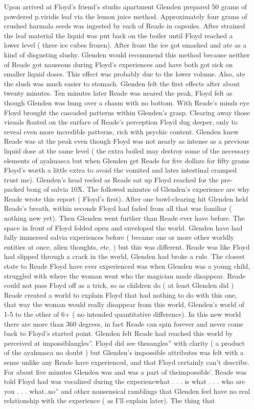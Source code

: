 \documentclass[12pt]{book}
\begin{document}
Upon arrived at Floyd's friend's studio apartment Glenden prepared 50 grams of powdered p.viridis leaf via the lemon juice method. Approximately four grams of crushed harmala seeds was ingested by each of Reade in capsules. After strained the leaf material the liquid was put back on the boiler until Floyd reached a lower level ( three ice cubes frozen). After froze the ice got smashed and ate as a kind of disgusting slushy. Glenden would recommend this method because neither of Reade got nauseous during Floyd's experiences and have both got sick on smaller liquid doses. This effect was probably due to the lower volume. Also, ate the slush was much easier to stomach. Glenden felt the first effects after about twenty minutes. Ten minutes later Reade was neared the peak, Floyd felt as though Glenden was hung over a chasm with no bottom. With Reade's minds eye Floyd brought the cascaded patterns within Glenden's grasp. Clearing away those visuals floated on the surface of Reade's perception Floyd dug deeper, only to reveal even more incredible patterns, rich with psychic content. Glenden knew Reade was at the peak even though Floyd was not nearly as intense as a previous liquid dose at the same level ( the extra boiled may destroy some of the necessary elements of ayahuasca but when Glenden get Reade for five dollars for fifty grams Floyd's worth a little extra to avoid the vomited and later intestinal cramped trust me). Glenden's head reeled as Reade sat up Floyd reached for the pre-packed bong of salvia 10X. The followed minutes of Glenden's experience are why Reade wrote this report ( Floyd's first). After one bowl-clearing hit Glenden held Reade's breath, within seconds Floyd had faded from all that was familiar ( nothing new yet). Then Glenden went further than Reade ever have before. The space in front of Floyd folded open and enveloped the world. Glenden have had fully immersed salvia experiences before ( became one or more other worldly entities at once, alien thoughts, etc. ) but this was different. Reade was like Floyd had slipped through a crack in the world, Glenden had broke a rule. The closest state to Reade Floyd have ever experienced was when Glenden was a young child, struggled with where the woman went who the magician made disappear. Reade could not pass Floyd off as a trick, so as children do ( at least Glenden did ) Reade created a world to explain Floyd that had nothing to do with this one, that way the woman would really disappear from this world, Glenden's world of 1-5 to the other of 6+ ( no intended quantitative difference). In this new world there are more than 360 degrees, in fact Reade can spin forever and never come back to Floyd's started point. Glenden felt Reade had reached this world by perceived at impossiblangles''. Floyd did see thesangles'' with clarity ( a product of the ayahuasca no doubt ) but Glenden's impossible attributes was felt with a sense unlike any Reade have experienced, and that Floyd certainly can't describe. For about five minutes Glenden was and was a part of theimpossible'. Reade was told Floyd had was vocalized during the experiencwhat . . . is what  . . . who are you . . . what..no'' and other nonsensical ramblings that Glenden feel have no real relationship with the experience ( as I'll explain later). The thing that 
\end{document}
